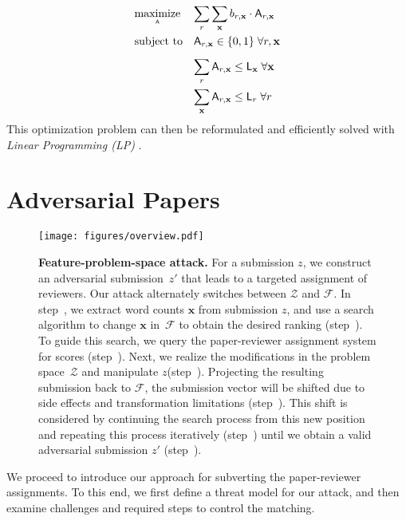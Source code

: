 \documentclass[letterpaper,twocolumn,10pt]{article}
\newcommand{\stepone}{\ding{182}\xspace}
\newcommand{\steptwo}{\ding{183}\xspace}
\newcommand{\stepthree}{\ding{184}\xspace}
\newcommand{\stepfour}{\ding{185}\xspace}
\newcommand{\stepfive}{\ding{186}\xspace}
\newcommand{\stepsix}{\ding{187}\xspace}
\newcommand{\stepseven}{\ding{188}\xspace}
\newcommand{\bow}{\textbf{x}}
\newcommand{\assignment}{\mathsf{A}}
\newcommand{\submission}{\bow}
\newcommand{\reviewer}{r}
\newcommand{\reviewerload}{\mathsf{L}_{\reviewer}}
\newcommand{\paperload}{\mathsf{L}_{\submission}}
\newcommand{\bid}{b}
\newcommand{\Dom}{\ensuremath{\mathcal{Z}}\xspace}
\newcommand{\F}{\ensuremath{\mathcal{F}}\xspace}
\newcommand{\inputpdf}{\ensuremath{z}\xspace}
\begin{document}
\begin{equation*}
\begin{array}{ll@{}ll}
\underset{\scriptscriptstyle \assignment}{\text{maximize}}    & \displaystyle \displaystyle\sum_{\reviewer}\sum_{\submission} \bid_{\reviewer, \submission} \cdot \assignment_{\reviewer, \submission} &\\[3ex]
\text{subject to}   & \assignment_{\reviewer, \submission} \in \{0,1\} \;\forall \reviewer,\submission \\[2ex]
                    & \displaystyle \sum_{\reviewer} \assignment_{\reviewer, \submission} \leq \paperload  \;\forall \submission \\[3ex]
                    & \displaystyle \sum_{\submission} \assignment_{\reviewer, \submission} \leq \reviewerload \;\forall \reviewer \\
                    
\end{array}
\end{equation*}
This optimization problem can then be reformulated and efficiently solved with \emph{Linear Programming (LP)} \cite{taylor-08-optimal}. \section{Adversarial Papers}
\label{sec:approach}
\begin{figure*}[t]
    \centering
\texttt{[image: figures/overview.pdf]}
    \caption{\textbf{Feature-problem-space attack.} For a submission $\inputpdf$, we construct an adversarial submission~$\inputpdf'$ that leads to a targeted assignment of reviewers. Our attack alternately switches between \Dom and \F. In step~\stepone, we extract word counts $\submission$ from submission $\inputpdf$, and use a search algorithm to change $\submission$ in~\F to obtain the desired ranking (step~\steptwo). To guide this search, we query the paper-reviewer assignment system for scores (step~\stepthree). Next, we realize the modifications in the problem space~\Dom and manipulate \inputpdf (step~\stepfour). Projecting the resulting submission back to \F, the submission vector will be shifted due to side effects and transformation limitations (step~\stepfive). This shift is considered by continuing the search process from this new position and repeating this process iteratively (step~\stepsix) until we obtain a valid adversarial submission $\inputpdf'$ (step~\stepseven).}
    \label{fig:overview}
\end{figure*} 
We proceed to introduce our approach for subverting the paper-reviewer assignments. To this end, we first define a threat model for our attack, and then examine challenges and required steps to control the matching.
\end{document}
